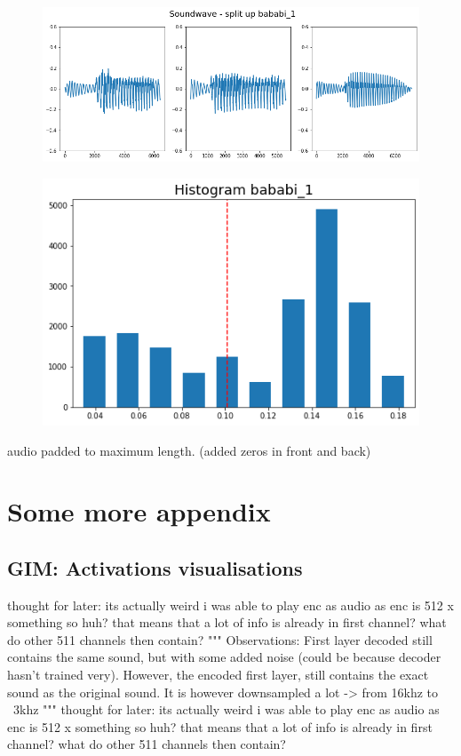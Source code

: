 \begin{appendices}
	
	\begin{figure}
		\centering
		\includegraphics[width=0.7\linewidth]{screenshot016}
		\caption{}
		\label{fig:split up sound wave}
	\end{figure}
	
	
	\begin{figure}
		\centering
		\includegraphics[width=0.4\linewidth]{screenshot018}
		\caption{}
		\label{fig:histogram}
	\end{figure}
	
	
	audio padded to maximum length. (added zeros in front and back)
	
	\chapter{Some more appendix}
	\section{GIM: Activations visualisations}
	
	thought for later: its actually weird i was able to play enc as audio as enc is 512 x something
	so huh? that means that a lot of info is already in first channel? what do other 511 channels then contain?
	"""
	Observations:
	First layer decoded still contains the same sound, but with some added noise (could be because decoder hasn't trained very).
	However, the encoded first layer, still contains the exact sound as the original sound. It is however downsampled a lot -> from 16khz to ~3khz
	"""
	thought for later: its actually weird i was able to play enc as audio as enc is 512 x something
	so huh? that means that a lot of info is already in first channel? what do other 511 channels then contain?
	

\end{appendices}
